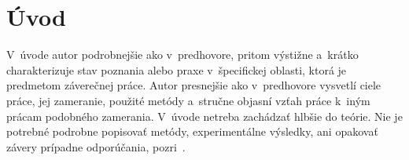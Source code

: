 \setcounter{page}{1}
\setcounter{equation}{0}
\setcounter{figure}{0}
\setcounter{table}{0}

\section*{Úvod}
V~úvode autor podrobnejšie ako v~predhovore, pritom výstižne a~krátko
charakterizuje stav poznania alebo praxe v~špecifickej oblasti, ktorá
je predmetom záverečnej práce. Autor presnejšie ako v~predhovore
vysvetlí ciele práce, jej zameranie, použité metódy a~stručne objasní
vzťah práce k~iným prácam podobného zamerania. V~úvode netreba
zachádzať hlbšie do teórie. Nie je potrebné podrobne popisovať metódy,
experimentálne výsledky, ani opakovať závery prípadne odporúčania,
pozri~\citep{kat}.